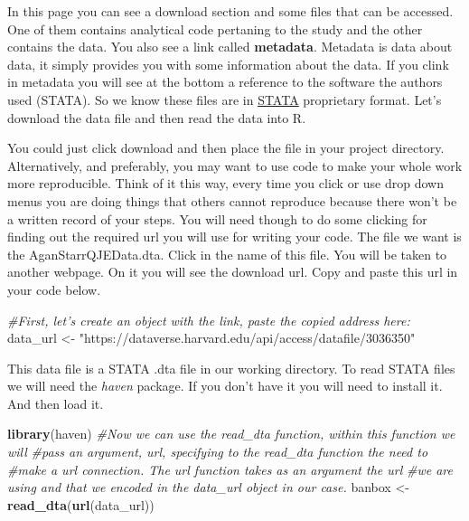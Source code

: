 \documentclass[]{book}
\newenvironment{Shaded}{\begin{snugshade}}{\end{snugshade}}
\newcommand{\CommentTok}[1]{\textcolor[rgb]{0.56,0.35,0.01}{\textit{#1}}}
\newcommand{\KeywordTok}[1]{\textcolor[rgb]{0.13,0.29,0.53}{\textbf{#1}}}
\newcommand{\NormalTok}[1]{#1}
\newcommand{\StringTok}[1]{\textcolor[rgb]{0.31,0.60,0.02}{#1}}
\theoremstyle{definition}
\theoremstyle{definition}
\theoremstyle{definition}
\theoremstyle{remark}
\begin{document}
In this page you can see a download section and some files that can be
accessed. One of them contains analytical code pertaning to the study
and the other contains the data. You also see a link called
\textbf{metadata}. Metadata is data about data, it simply provides you
with some information about the data. If you clink in metadata you will
see at the bottom a reference to the software the authors used (STATA).
So we know these files are in \href{https://www.stata.com/}{STATA}
proprietary format. Let's download the data file and then read the data
into R.

You could just click download and then place the file in your project
directory. Alternatively, and preferably, you may want to use code to
make your whole work more reproducible. Think of it this way, every time
you click or use drop down menus you are doing things that others cannot
reproduce because there won't be a written record of your steps. You
will need though to do some clicking for finding out the required url
you will use for writing your code. The file we want is the
AganStarrQJEData.dta. Click in the name of this file. You will be taken
to another webpage. On it you will see the download url. Copy and paste
this url in your code below.

\begin{Shaded}
\begin{Highlighting}[]
\CommentTok{#First, let's create an object with the link, paste the copied address here:}
\NormalTok{data_url <-}\StringTok{ "https://dataverse.harvard.edu/api/access/datafile/3036350"}
\end{Highlighting}
\end{Shaded}

This data file is a STATA .dta file in our working directory. To read
STATA files we will need the \emph{haven} package. If you don't have it
you will need to install it. And then load it.

\begin{Shaded}
\begin{Highlighting}[]
\KeywordTok{library}\NormalTok{(haven)}
\CommentTok{#Now we can use the read_dta function, within this function we will}
\CommentTok{#pass an argument, url, specifying to the read_dta function the need to}
\CommentTok{#make a url connection. The url function takes as an argument the url}
\CommentTok{#we are using and that we encoded in the data_url object in our case.}
\NormalTok{banbox <-}\StringTok{ }\KeywordTok{read_dta}\NormalTok{(}\KeywordTok{url}\NormalTok{(data_url))}
\end{Highlighting}
\end{Shaded}
\end{document}
